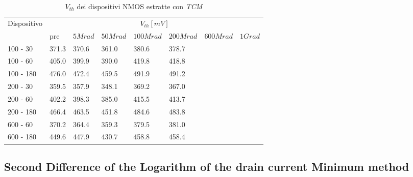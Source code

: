 \documentclass[12pt, letterpaper]{book}
\begin{document}
\begin{table}[H]
  \renewcommand{\arraystretch}{1.3}
    \begin{tabular}{m{2cm} m{0.8cm} m{1.1cm} m{1.3cm} m{1.5cm} m{1.5cm} m{1.5cm} m{1cm}}
      \toprule
      \multirow{2}{*}{Dispositivo} & \multicolumn{7}{c}{$V_{th} [mV] $}                                                                    \\
      \cmidrule{2-8}
                                   & pre                               & $5Mrad$ & $50Mrad$ & $100Mrad$ & $200Mrad$ & $600Mrad$ & $1Grad$ \\
      \midrule
      100 - 30                 	&371.3                              &370.6    &361.0     &380.6      & 378.7     &      &    \\
      \hline
      100 - 60                  	&405.0                              &399.9    &390.0     &419.8      & 418.8     &      &    \\
      \hline
      100 - 180               	&476.0                              &472.4    &459.5     &491.9      &491.2      &      &    \\
      \hline
      200 - 30 			& 359.5                             &357.9    &348.1     & 369.2     &367.0      &     &    \\
      \hline
      200 - 60                  	& 402.2                             &398.3    & 385.0    &415.5      & 413.7    &      &    \\
      \hline
      200 - 180                    &466.4                              &463.5    &451.8     &484.6      & 483.8     &      &    \\
      \hline
      600 - 60              	&370.2                              &364.4    &359.3     &379.5      & 381.0     &      &    \\
      \hline
      600 - 180                    &449.6                              &447.9    &430.7     &458.8      &458.4     &      &    \\
      \bottomrule
    \end{tabular}
  \caption{$V_{th}$ dei dispositivi NMOS estratte con \emph{TCM}}
  \label{tab:VthTCMN}
\end{table}




\subsection{Second Difference of the Logarithm of the drain current Minimum method}
\end{document}

